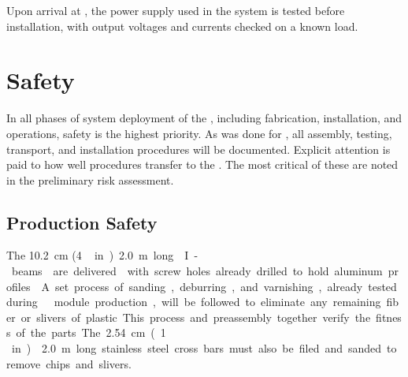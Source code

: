 Upon arrival at \surf, the power supply used in the   system is tested before installation, with output voltages and currents checked on a known load. 

\noindent 
\section{Safety}
In all phases of  system deployment of the \dpmod, including fabrication, installation, and operations, safety is the highest priority.  As was done for , all assembly, testing, transport, and installation procedures will be documented. Explicit attention is paid to how well  procedures transfer to the \dpmod. The most critical of these are noted in the preliminary  risk assessment. 

\subsection{Production Safety}
\label{sec:fddp-hv-prod-safety}

The \SI{10.2}{\cm} (\SI{4}\,in) \SI{2.0}{\m} long  I-beams 
 are delivered  with screw holes already drilled to hold aluminum profiles. 
 A set process of sanding, deburring, and varnishing, already tested during   module production, will be followed to eliminate any remaining fiber or slivers of plastic.  This process and preassembly together verify the fitness of the parts. The \SI{2.54}{\cm} (\SI{1}\,in)   \SI{2.0}{\m} long stainless steel cross bars must also be filed and sanded to remove chips and slivers.

